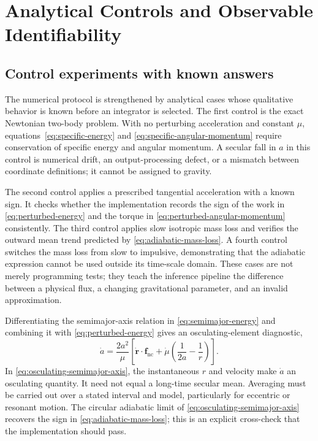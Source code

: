 \documentclass[10pt,conference]{IEEEtran}
\begin{document}
\section{Analytical Controls and Observable Identifiability}
\label{sec:analytical-controls}

\subsection{Control experiments with known answers}

The numerical protocol is strengthened by analytical cases whose qualitative behavior is known before an integrator is selected. The first control is the exact Newtonian two-body problem. With no perturbing acceleration and constant $\mu$, equations~\eqref{eq:specific-energy} and \eqref{eq:specific-angular-momentum} require conservation of specific energy and angular momentum. A secular fall in $a$ in this control is numerical drift, an output-processing defect, or a mismatch between coordinate definitions; it cannot be assigned to gravity.

The second control applies a prescribed tangential acceleration with a known sign. It checks whether the implementation records the sign of the work in \eqref{eq:perturbed-energy} and the torque in \eqref{eq:perturbed-angular-momentum} consistently. The third control applies slow isotropic mass loss and verifies the outward mean trend predicted by \eqref{eq:adiabatic-mass-loss}. A fourth control switches the mass loss from slow to impulsive, demonstrating that the adiabatic expression cannot be used outside its time-scale domain. These cases are not merely programming tests; they teach the inference pipeline the difference between a physical flux, a changing gravitational parameter, and an invalid approximation.

Differentiating the semimajor-axis relation in \eqref{eq:semimajor-energy} and combining it with \eqref{eq:perturbed-energy} gives an osculating-element diagnostic,
\begin{equation}
\dot{a}=\frac{2a^2}{\mu}\left[\dot{\mathbf{r}}\cdot\mathbf{f}_{\mathrm{nc}}+\dot{\mu}\left(\frac{1}{2a}-\frac{1}{r}\right)\right].
\label{eq:osculating-semimajor-axis}
\end{equation}
In \eqref{eq:osculating-semimajor-axis}, the instantaneous $r$ and velocity make $\dot{a}$ an osculating quantity. It need not equal a long-time secular mean. Averaging must be carried out over a stated interval and model, particularly for eccentric or resonant motion. The circular adiabatic limit of \eqref{eq:osculating-semimajor-axis} recovers the sign in \eqref{eq:adiabatic-mass-loss}; this is an explicit cross-check that the implementation should pass.
\end{document}
